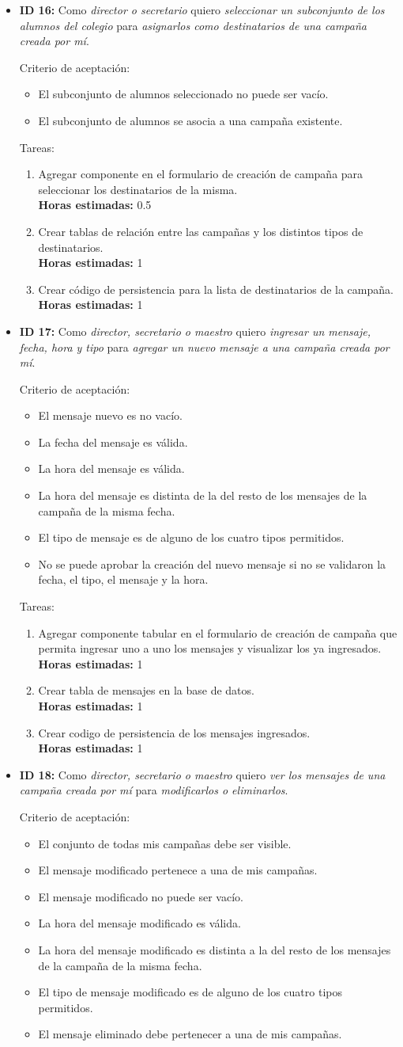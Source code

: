 \documentclass[a4paper, 10pt, twoside]{article}
\newenvironment{stories}{
  \begin{itemize}
}{
  \end{itemize}
}
\newcommand{\storyid}[4]{
  \item
  \textbf{ID #1:} Como \emph{#2} quiero \emph{#3} para \emph{#4}.
}
\newenvironment{tasks}{
  Tareas:
  \begin{enumerate}
}{
  \end{enumerate}
}
\newcommand{\task}[1] {
  \item #1.\\
  \textbf{Horas estimadas:}
}
\newenvironment{criterios}{
  Criterio de aceptación:
  \begin{itemize}
}{
  \end{itemize}
}
\newcommand{\criteria}[1] {
  \item #1
}
\begin{document}
\begin{stories}
  \storyid{16}
          {director o secretario}
          {seleccionar un subconjunto de los alumnos del colegio}
          {asignarlos como destinatarios de una campaña creada por mí}
        
   \begin{criterios}
  	\criteria{El subconjunto de alumnos seleccionado no puede ser vacío.}
    \criteria{El subconjunto de alumnos se asocia a una campaña existente.}
  \end{criterios} 

  \begin{tasks}
    \task{Agregar componente en el formulario de creación de campaña para seleccionar los destinatarios de la misma} 0.5
    \task{Crear tablas de relación entre las campañas y los distintos tipos de destinatarios} 1
    \task{Crear código de persistencia para la lista de destinatarios de la campaña} 1
  \end{tasks}
  
  
  \storyid{17}{director, secretario o maestro}
             {ingresar un mensaje, fecha, hora y tipo}
             {agregar un nuevo mensaje a una campaña creada por mí}

   \begin{criterios}
  	\criteria{El mensaje nuevo es no vacío.}
    \criteria{La fecha del mensaje es válida.}
    \criteria{La hora del mensaje es válida.}
    \criteria{La hora del mensaje es distinta de la del resto de los mensajes de la campaña de la misma fecha.}
    \criteria{El tipo de mensaje es de alguno de los cuatro tipos permitidos.}
    \criteria{No se puede aprobar la creación del nuevo mensaje si no se validaron la fecha, el tipo, el mensaje y la hora.}
  \end{criterios} 
   
  \begin{tasks}
    \task{Agregar componente tabular en el formulario de creación de campaña que permita ingresar uno a uno los mensajes y visualizar los ya ingresados} 1
    \task{Crear tabla de mensajes en la base de datos} 1
    \task{Crear codigo de persistencia de los mensajes ingresados} 1
  \end{tasks}


  \storyid{18}
          {director, secretario o maestro}
          {ver los mensajes de una campaña creada por mí}
          {modificarlos o eliminarlos}

   \begin{criterios}
    \criteria{El conjunto de todas mis campañas debe ser visible.}
    \criteria{El mensaje modificado pertenece a una de mis campañas.}
  	\criteria{El mensaje modificado no puede ser vacío.}
    \criteria{La hora del mensaje modificado es válida.}
    \criteria{La hora del mensaje modificado es distinta a la del resto de los mensajes de la campaña de la misma fecha.}
    \criteria{El tipo de mensaje modificado es de alguno de los cuatro tipos permitidos.}
    \criteria{El mensaje eliminado debe pertenecer a una de mis campañas.}
  \end{criterios} 


\end{stories}
\end{document}
